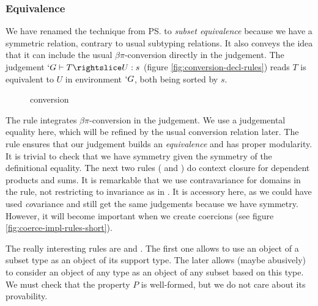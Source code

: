 \documentclass{llncs}
\def\figureshrink{0em}
\begin{document}
\subsubsection{Equivalence}
We have renamed the technique from \ps{} to 
\emph{subset equivalence} because we have a symmetric relation, contrary
to usual subtyping relations. It also conveys the idea that it can
include the usual $\beta\pi$-conversion directly in the judgement.
The judgement $`G \typed T \subd{} U : s$ (figure
\vref{fig:conversion-decl-rules}) reads $T$ is equivalent to $U$ in
environment $`G$, both being sorted by $s$. 

\begin{figure}[h]
  \vspace{\figureshrink}
  \subtdRules
  \vspace{\figureshrink}
  \caption{\Russell{} conversion}
  \label{fig:conversion-decl-rules}
  \vspace{\figureshrink}
\end{figure}

The rule  integrates $\beta\pi$-conversion in the
judgement. We use a judgemental equality here, which will be refined by
the usual conversion relation later. The  rule ensures
that our judgement builds an \emph{equivalence} and has
proper modularity. It is trivial to check that we have symmetry given 
the symmetry of the definitional equality. The next two rules ( and
) do context closure for dependent
products and sums. It is remarkable that we use contravariance for
domains in the  rule, not restricting to invariance as in
\PVS. It is accessory here, as we could have used \emph{co}variance and
still get the same judgements because we have symmetry. However, it will
become important when we create coercions (see figure
\vref{fig:coerce-impl-rules-short}).

The really interesting rules are  and
. The first one allows to use an object of a subset type
as an object of its support type. The later allows (maybe abusively) to
consider an object of any type as an object of any subset based on
this type. We must check that the property $P$ is well-formed, but
we do not care about its provability.
\end{document}
